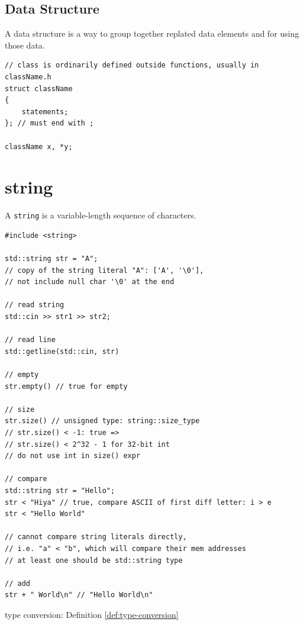 \documentclass{article}
\begin{document}
\subsection{Data Structure}
\begin{definition}[structure]
    A data structure is a way to group together replated data elements and for using those data.
    \begin{verbatim}
// class is ordinarily defined outside functions, usually in className.h
struct className
{
    statements;
}; // must end with ;

className x, *y;
\end{verbatim}
\end{definition}

\section{string}
\begin{definition}[string]
    A \verb|string| is a variable-length sequence of characters.
    \begin{verbatim}
#include <string>

std::string str = "A";
// copy of the string literal "A": ['A', '\0'],
// not include null char '\0' at the end

// read string
std::cin >> str1 >> str2;

// read line
std::getline(std::cin, str)

// empty
str.empty() // true for empty

// size
str.size() // unsigned type: string::size_type
// str.size() < -1: true =>
// str.size() < 2^32 - 1 for 32-bit int
// do not use int in size() expr

// compare
std::string str = "Hello";
str < "Hiya" // true, compare ASCII of first diff letter: i > e
str < "Hello World"

// cannot compare string literals directly,
// i.e. "a" < "b", which will compare their mem addresses
// at least one should be std::string type

// add
str + " World\n" // "Hello World\n"
\end{verbatim}
    type conversion: Definition \ref{def:type-conversion}
\end{definition}
\end{document}
